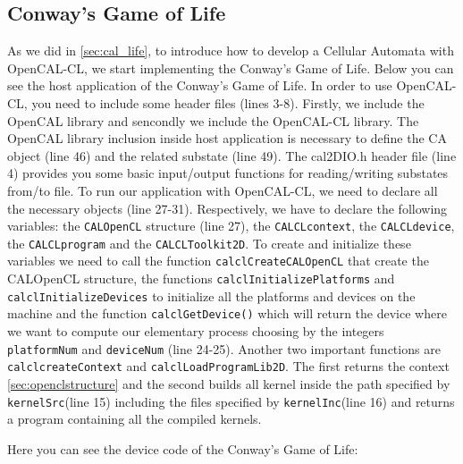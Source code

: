 \subsection{Conway’s Game of Life}
 
 
As we did in \ref{sec:cal_life}, to introduce how to develop a
Cellular Automata with OpenCAL-CL, we start implementing the Conway’s
Game of Life.  Below you can see the host application of the Conway’s
Game of Life.  In order to use OpenCAL-CL, you need to include some
header files (lines 3-8).  Firstly, we include the OpenCAL library and
sencondly we include the OpenCAL-CL library.  The OpenCAL library
inclusion inside host application is necessary to define the CA object
(line 46) and the related substate (line 49). The cal2DIO.h header
file (line 4) provides you some basic input/output functions for
reading/writing substates from/to file.  To run our application with
OpenCAL-CL, we need to declare all the necessary objects (line
27-31). Respectively, we have to declare the following variables: the
\verb'CALOpenCL' structure (line 27), the \verb'CALCLcontext', the
\verb'CALCLdevice', the \verb'CALCLprogram' and the
\verb'CALCLToolkit2D'.  To create and initialize these variables we
need to call the function \verb'calclCreateCALOpenCL' that create the
CALOpenCL structure, the functions \verb|calclInitializePlatforms| and
\verb|calclInitializeDevices| to initialize all the platforms and
devices on the machine and the function \verb'calclGetDevice()' which
will return the device where we want to compute our elementary process
choosing by the integers \verb'platformNum' and \verb'deviceNum' (line
24-25).  Another two important functions are \verb'calclcreateContext'
and \verb'calclLoadProgramLib2D'.  The first returns the context
\ref{sec:openclstructure} and the second builds all kernel inside the
path specified by \verb'kernelSrc'(line 15) including the files
specified by \verb'kernelInc'(line 16) and returns a program
containing all the compiled kernels.

 Here
you can see the device code of the Conway’s Game of Life:


 
